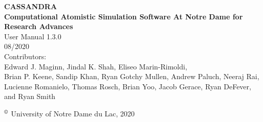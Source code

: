 \begin{center}
\vspace*{2 in}
{\huge{\bf CASSANDRA} }\\
\vspace{0.5in}
{\huge { \bf  Computational Atomistic Simulation Software At Notre Dame for Research Advances}} \\
\vspace{1 in}
User Manual 1.3.0 \\
\vspace{.2 in}
08/2020 \\
\vspace{0.2in}
Contributors: \\
\vspace{0.2in}
Edward J. Maginn, Jindal K. Shah, Eliseo Marin-Rimoldi, \\
Brian P. Keene, Sandip Khan, Ryan Gotchy Mullen, Andrew Paluch,
Neeraj Rai, Lucienne Romanielo, Thomas Rosch, Brian Yoo, Jacob Gerace, Ryan DeFever, and Ryan Smith
\end{center}
\vspace{1.0in}
$^\copyright$ University of Notre Dame du Lac, 2020

